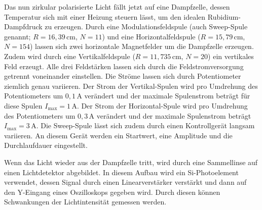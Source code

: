 Das nun zirkular polarisierte Licht fällt jetzt auf eine Dampfzelle, dessen Temperatur sich mit einer Heizung steuern lässt, um den idealen Rubidium-Dampfdruck zu erzeugen.
Durch eine Modulationsfeldspule (auch Sweep-Spule genannt; $R=16,39\,\text{cm}$, $N=11$) und eine Horizontalfeldspule ($R=15,79\,\text{cm}$, $N=154$) lassen sich zwei horizontale Magnetfelder um die Dampfzelle erzeugen. Zudem wird durch eine Vertikalfeldspule ($R=11,735\,\text{cm}$, $N=20$) ein vertikales Feld erzeugt. Alle drei Feldstärken lassen sich durch die Feldstromversorgung getrennt voneinander einstellen. Die Ströme lassen sich durch Potentiometer ziemlich genau variieren. Der Strom der Vertikal-Spulen wird pro Umdrehung des Potentiometers um $0,1\,\text{A}$ verändert und der maximale Spulenstrom beträgt für diese Spulen $I_\text{max}=1\,\text{A}$.  Der Strom der Horizontal-Spule wird pro Umdrehung des Potentiometers um $0,3\,\text{A}$ verändert und der maximale Spulenstrom beträgt  $I_\text{max}=3\,\text{A}$.
Die Sweep-Spule lässt sich zudem durch einen Kontrollgerät langsam variieren. An diesem Gerät werden ein Startwert, eine Amplitude und die Durchlaufdauer eingestellt.

Wenn das Licht wieder aus der Dampfzelle tritt, wird durch eine Sammellinse auf einen Lichtdetektor abgebildet. In diesem Aufbau wird ein Si-Photoelement verwendet, dessen Signal durch einen Linearverstärker verstärkt und dann auf den Y-Eingang eines Oszilloskops gegeben wird. Durch diesen können Schwankungen der Lichtintensität gemessen werden.

